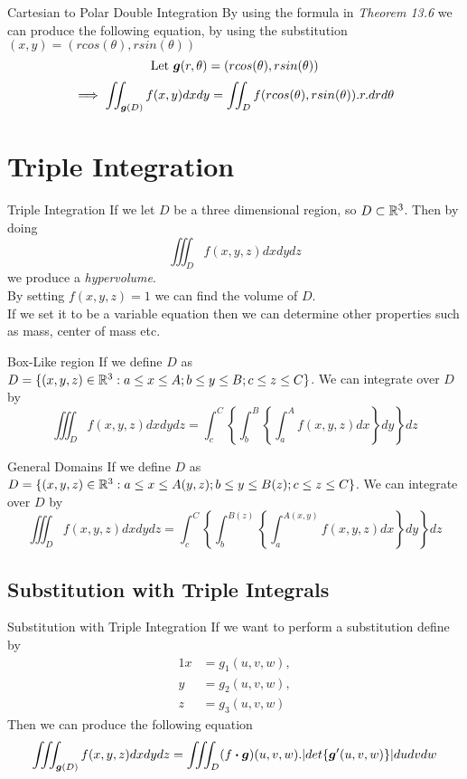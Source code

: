 \documentclass[11pt,a4paper]{article}
\begin{document}
\subtitle{Remark 13.08 - }{Cartesian to Polar Double Integration}
By using the formula in \textit{Theorem 13.6} we can produce the following equation, by using the substitution $(x, y) = (rcos(\theta), rsin(\theta))$
$$\mathrm{Let}\ \boldsymbol{g}(r, \theta) = (rcos(\theta), rsin(\theta))$$
$$\implies \iint_{\boldsymbol{g}(D)} f(x, y) dx dy = \iint_D f(rcos(\theta), rsin(\theta)). r . dr d\theta$$

\section{Triple Integration}

\subtitle{Remark 14.01 - }{Triple Integration}
If we let $D$ be a three dimensional region, so $D \subset \mathbb{R}^3$. Then by doing
$$\iiint_{D}f(x, y, z)dxdydz$$
we produce a \textit{hypervolume}.\\
By setting $f(x, y, z) = 1$ we can find the volume of $D$.\\
If we set it to be a variable equation then we can determine other properties such as mass, center of mass etc.\\

\subtitle{Theorem 14.02 - }{Box-Like region}
If we define $D$ as $D = \{(x, y , z) \in \mathbb{R}^3 : a \leq x \leq A; b \leq y \leq B; c \leq z \leq C \}$. We can integrate over $D$ by
$$\iiint_{D}f(x, y , z)dxdydz = \int_{c}^{C} \left\{ \int_{b}^{B} \left\{ \int_{a}^{A} f(x, y, z) dx \right\} dy \right\} dz$$

\subtitle{Theorem 14.03 - }{General Domains}
If we define $D$ as $D = \{ (x, y , z) \in \mathbb{R}^3: a \leq x \leq A(y, z); b \leq y \leq B(z); c \leq z \leq C \}$. We can integrate over $D$ by
$$\iiint_{D}f(x, y , z)dxdydz = \int_{c}^{C} \left\{ \int_{b}^{B(z)} \left\{ \int_{a}^{A(x, y)} f(x, y, z) dx \right\} dy \right\} dz$$

\subsection{Substitution with Triple Integrals}

\subtitle{Theorem 14.04 - }{Substitution with Triple Integration}
If we want to perform a substitution define by
\begin{alignat*}{1}
  x &= g_1(u, v, w), \\
  y &= g_2(u, v, w), \\
  z &= g_3(u, v, w)
\end{alignat*}
Then we can produce the following equation
$$\iiint_{\boldsymbol{g}(D)} f(x, y, z) dx dy dz = \iiint_{D} (f \boldsymbol{\cdot} \boldsymbol{g})(u, v, w).|det \{\boldsymbol{g}'(u, v, w)\}| du dv dw$$
\end{document}
